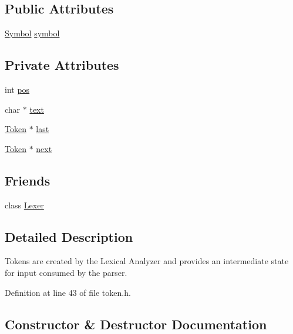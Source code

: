 \subsection*{Public Attributes}
\begin{DoxyCompactItemize}
\item 
\hyperlink{lex_8h_a7feef761cd73fac6e25b8bb80d2c4e54}{Symbol} \hyperlink{structToken_aa671eaaae5632c5277e89a090d864820}{symbol}
\end{DoxyCompactItemize}
\subsection*{Private Attributes}
\begin{DoxyCompactItemize}
\item 
int \hyperlink{structToken_afc3014d7e8cbd70e58a55bea24fc2544}{pos}
\item 
char $\ast$ \hyperlink{structToken_ab2d6b41ba04b1a1e272d7e963303f8db}{text}
\item 
\hyperlink{structToken}{Token} $\ast$ \hyperlink{structToken_a0ea44230386ca31fabb9a4946249d53f}{last}
\item 
\hyperlink{structToken}{Token} $\ast$ \hyperlink{structToken_a32f24a25af788c192e5b387dc8d67914}{next}
\end{DoxyCompactItemize}
\subsection*{Friends}
\begin{DoxyCompactItemize}
\item 
class \hyperlink{structToken_a2e54c4809acbcd06c4bd4f186ad91584}{Lexer}
\end{DoxyCompactItemize}


\subsection{Detailed Description}
Tokens are created by the Lexical Analyzer and provides an intermediate state for input consumed by the parser. 

Definition at line 43 of file token.\+h.



\subsection{Constructor \& Destructor Documentation}
